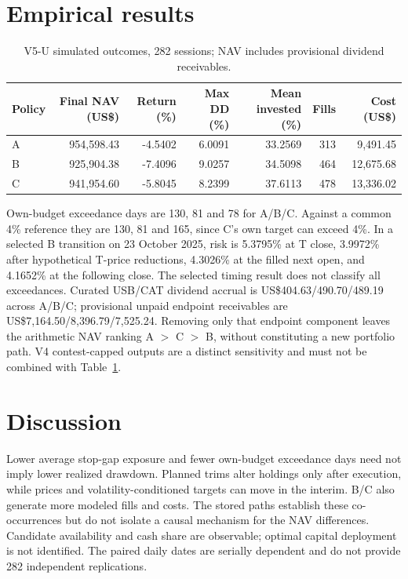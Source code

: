 \documentclass[11pt]{article}
\begin{document}
\section{Empirical results}
\begin{table}[ht]
\centering
\caption{V5-U simulated outcomes, 282 sessions; NAV includes provisional dividend receivables.}
\label{tab:main}
\begin{tabular}{lrrrrrr}
\toprule
Policy & Final NAV (US\$) & Return (\%) & Max DD (\%) & Mean invested (\%) & Fills & Cost (US\$)\\
\midrule
A & 954,598.43 & -4.5402 & 6.0091 & 33.2569 & 313 & 9,491.45\\
B & 925,904.38 & -7.4096 & 9.0257 & 34.5098 & 464 & 12,675.68\\
C & 941,954.60 & -5.8045 & 8.2399 & 37.6113 & 478 & 13,336.02\\
\bottomrule
\end{tabular}
\end{table}
Own-budget exceedance days are 130, 81 and 78 for A/B/C. Against a common 4\% reference they are 130, 81 and 165, since C's own target can exceed 4\%. In a selected B transition on 23 October 2025, risk is 5.3795\% at T close, 3.9972\% after hypothetical T-price reductions, 4.3026\% at the filled next open, and 4.1652\% at the following close. The selected timing result does not classify all exceedances. Curated USB/CAT dividend accrual is US\$404.63/490.70/489.19 across A/B/C; provisional unpaid endpoint receivables are US\$7,164.50/8,396.79/7,525.24. Removing only that endpoint component leaves the arithmetic NAV ranking A $>$ C $>$ B, without constituting a new portfolio path. V4 contest-capped outputs are a distinct sensitivity and must not be combined with Table~\ref{tab:main}.

\section{Discussion}
Lower average stop-gap exposure and fewer own-budget exceedance days need not imply lower realized drawdown. Planned trims alter holdings only after execution, while prices and volatility-conditioned targets can move in the interim. B/C also generate more modeled fills and costs. The stored paths establish these co-occurrences but do not isolate a causal mechanism for the NAV differences. Candidate availability and cash share are observable; optimal capital deployment is not identified. The paired daily dates are serially dependent and do not provide 282 independent replications.
\end{document}
